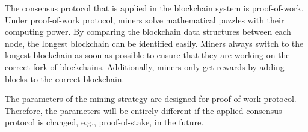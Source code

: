 The consensus protocol that is applied in the blockchain system is proof-of-work. Under proof-of-work protocol, miners solve mathematical puzzles with their computing power. By comparing the blockchain data structures between each node, the longest blockchain can be identified easily. Miners always switch to the longest blockchain as soon as possible to ensure that they are working on the correct fork of blockchains. Additionally, miners only get rewards by adding blocks to the correct blockchain.

The parameters of the mining strategy are designed for proof-of-work protocol. Therefore, the parameters will be entirely different if the applied consensus protocol is changed, e.g., proof-of-stake, in the future.